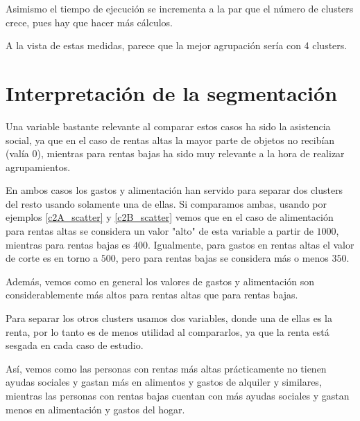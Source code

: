 Asimismo el tiempo de ejecución se incrementa a la par que el número de clusters crece, pues hay que hacer más cálculos.

A la vista de estas medidas, parece que la mejor agrupación sería con 4 clusters.


\section{Interpretación de la segmentación}

Una variable bastante relevante al comparar estos casos ha sido la asistencia social, ya que en el caso de rentas altas la mayor parte de objetos no recibían (valía 0), mientras para rentas bajas ha sido muy relevante a la hora de realizar agrupamientos.

En ambos casos los gastos y alimentación han servido para separar dos clusters del resto usando solamente una de ellas. Si comparamos ambas, usando por ejemplos \eqref{c2A_scatter} y \eqref{c2B_scatter} vemos que en el caso de alimentación para rentas altas se considera un valor "alto" de esta variable a partir de $1000$, mientras para rentas bajas es $400$. Igualmente, para gastos en rentas altas el valor de corte es en torno a $500$, pero para rentas bajas se considera más o menos $350$.

Además, vemos como en general los valores de gastos y alimentación son considerablemente más altos para rentas altas que para rentas bajas.

Para separar los otros clusters usamos dos variables, donde una de ellas es la renta, por lo tanto es de menos utilidad al compararlos, ya que la renta está sesgada en cada caso de estudio.

Así, vemos como las personas con rentas más altas prácticamente no tienen ayudas sociales y gastan más en alimentos y gastos de alquiler y similares, mientras las personas con rentas bajas cuentan con más ayudas sociales y gastan menos en alimentación y gastos del hogar.




